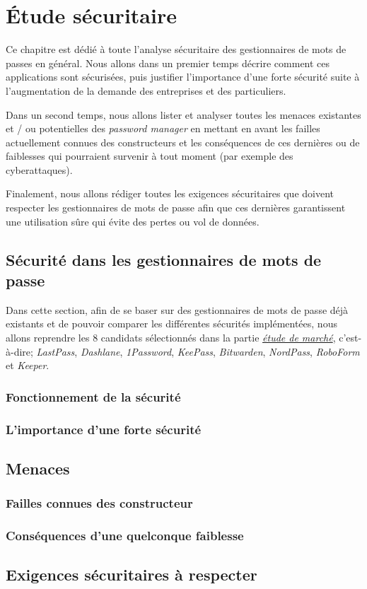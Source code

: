 
\chapter{Étude sécuritaire}
\label{ch:etude_secu}

Ce chapitre est dédié à toute l'analyse sécuritaire des gestionnaires de mots de passes en général. Nous allons dans un premier temps décrire comment ces applications sont sécurisées, puis justifier l'importance d'une forte sécurité suite à l'augmentation de la demande des entreprises et des particuliers.

Dans un second temps, nous allons lister et analyser toutes les menaces existantes et / ou potentielles des \textit{password manager} en mettant en avant les failles actuellement connues des constructeurs et les conséquences de ces dernières ou de faiblesses qui pourraient survenir à tout moment (par exemple des cyberattaques).

Finalement, nous allons rédiger toutes les exigences sécuritaires que doivent respecter les gestionnaires de mots de passe afin que ces dernières garantissent une utilisation sûre qui évite des pertes ou vol de données.

\section{Sécurité dans les gestionnaires de mots de passe}

Dans cette section, afin de se baser sur des gestionnaires de mots de passe déjà existants et de pouvoir comparer les différentes sécurités implémentées, nous allons reprendre les 8 candidats sélectionnés dans la partie \hyperref[ch:etude_marche]{\textit{étude de marché}}, c'est-à-dire; \textit{LastPass}, \textit{Dashlane}, \textit{1Password}, \textit{KeePass}, \textit{Bitwarden}, \textit{NordPass}, \textit{RoboForm} et \textit{Keeper}.
\subsection{Fonctionnement de la sécurité}
\subsection{L'importance d'une forte sécurité}
\section{Menaces}
\subsection{Failles connues des constructeur}
\subsection{Conséquences d'une quelconque faiblesse}
\section{Exigences sécuritaires à respecter}